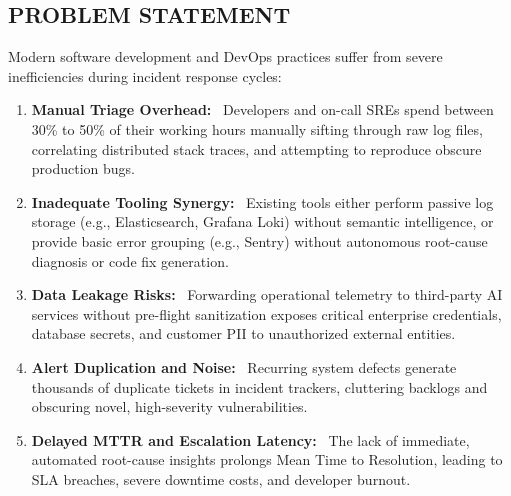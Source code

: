 \documentclass[12pt,a4paper]{article}
\newcommand{\lead}[1]{\textbf{#1}\ }
\begin{document}
\subsection{PROBLEM STATEMENT}
Modern software development and DevOps practices suffer from severe inefficiencies during incident response cycles:
\begin{enumerate}[leftmargin=1.5em]
    \item \lead{Manual Triage Overhead:} Developers and on-call SREs spend between 30\% to 50\% of their working hours manually sifting through raw log files, correlating distributed stack traces, and attempting to reproduce obscure production bugs.
    \item \lead{Inadequate Tooling Synergy:} Existing tools either perform passive log storage (e.g., Elasticsearch, Grafana Loki) without semantic intelligence, or provide basic error grouping (e.g., Sentry) without autonomous root-cause diagnosis or code fix generation.
    \item \lead{Data Leakage Risks:} Forwarding operational telemetry to third-party AI services without pre-flight sanitization exposes critical enterprise credentials, database secrets, and customer PII to unauthorized external entities.
    \item \lead{Alert Duplication and Noise:} Recurring system defects generate thousands of duplicate tickets in incident trackers, cluttering backlogs and obscuring novel, high-severity vulnerabilities.
    \item \lead{Delayed MTTR and Escalation Latency:} The lack of immediate, automated root-cause insights prolongs Mean Time to Resolution, leading to SLA breaches, severe downtime costs, and developer burnout.
\end{enumerate}
\end{document}
